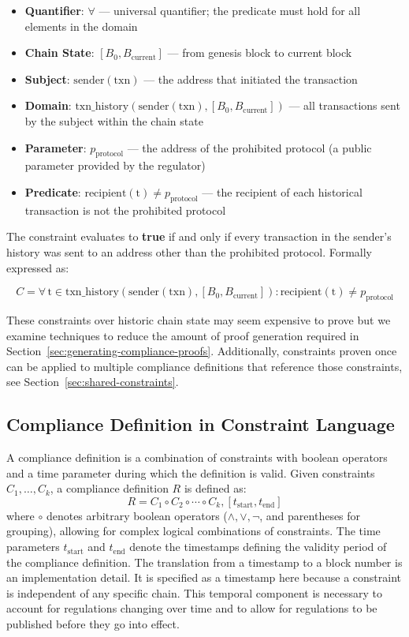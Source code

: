 \documentclass[9pt]{extreport}
\begin{document}
\begin{itemize}
    \item \textbf{Quantifier}: $\forall$ --- universal quantifier; the predicate must hold for all elements in the domain
    \item \textbf{Chain State}: $[B_0, B_{\text{current}}]$ --- from genesis block to current block
    \item \textbf{Subject}: $\text{sender}(\text{txn})$ --- the address that initiated the transaction
    \item \textbf{Domain}: $\text{txn\_history}(\text{sender}(\text{txn}), [B_0, B_{\text{current}}])$ --- all transactions sent by the subject within the chain state
    \item \textbf{Parameter}: $p_{\text{protocol}}$ --- the address of the prohibited protocol (a public parameter provided by the regulator)
    \item \textbf{Predicate}: $\text{recipient}(\text{t}) \neq p_{\text{protocol}}$ --- the recipient of each historical transaction is not the prohibited protocol
\end{itemize}

The constraint evaluates to \textbf{true} if and only if every transaction in the sender's history was sent to an address other than the prohibited protocol.  Formally expressed as:

$$C = \forall \, \text{t} \in \text{txn\_history}(\text{sender}(\text{txn}), [B_0, B_{\text{current}}]) : \text{recipient}(\text{t}) \neq p_{\text{protocol}}$$

These constraints over historic chain state may seem expensive to prove but we examine techniques to reduce the amount of proof generation required in Section~\ref{sec:generating-compliance-proofs}.  Additionally, constraints proven once can be applied to multiple compliance definitions that reference those constraints, see Section~\ref{sec:shared-constraints}.

\subsection{Compliance Definition in Constraint Language} 
\label{sec:compliance-definition-in-constraint}
A compliance definition is a combination of constraints with boolean operators and a time parameter during which the definition is valid.   Given constraints $C_1, \ldots, C_k$, a compliance definition $R$ is defined as:
$$R = C_1 \circ C_2 \circ \cdots \circ C_k, [t_{\text{start}}, t_{\text{end}}]$$
where $\circ$ denotes arbitrary boolean operators ($\land, \lor, \lnot$, and parentheses for grouping), allowing for complex logical combinations of constraints. The time parameters $t_{\text{start}}$ and $t_{\text{end}}$ denote the timestamps defining the validity period of the compliance definition.  The translation from a timestamp to a block number is an implementation detail.  It is specified as a timestamp here because a constraint is independent of any specific chain.  This temporal component is necessary to account for regulations changing over time and to allow for regulations to be published before they go into effect.
\end{document}
